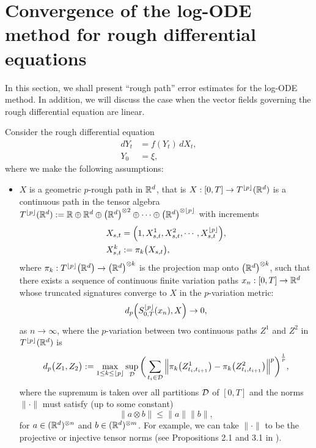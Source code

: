 \section{Convergence of the log-ODE method for rough differential equations}\label{apx:logodeconv}

In this section, we shall present ``rough path'' error estimates for the log-ODE method. In addition, we will discuss the case when the vector fields governing the rough differential equation are linear.
\medbreak

\begin{theorem}\label{thm:logODEthm}
Consider the rough differential equation
\begin{align}
dY_t & = f(Y_t)\,dX_t,\label{eq:RDE}\\
Y_0 & = \xi,\nonumber
\end{align}
where we make the following assumptions:
\begin{itemize}
\item $X$ is a geometric $p$-rough path in $\mathbb{R}^d$, that is $X : [0,T] \rightarrow T^{\lfloor p \rfloor}(\mathbb{R}^d)$ is a continuous path in the tensor algebra
$T^{\lfloor p \rfloor}(\mathbb{R}^d) := \mathbb{R} \oplus \mathbb{R}^d \oplus \big(\mathbb{R}^d\big)^{\otimes 2} \oplus \cdots \oplus \big(\mathbb{R}^d\big)^{\otimes \lfloor p \rfloor}$ with increments
\begin{align}
X_{s,t} & = \Big(1, X_{s,t}^1, X_{s,t}^2, \cdots, X_{s,t}^{\lfloor p \rfloor}\Big),\label{eq:roughpathincrements}\\
X_{s,t}^k & := \pi_k\big(X_{s,t}\big),\nonumber
\end{align}
where $\pi_k : T^{\lfloor p \rfloor}\big(\mathbb{R}^d\big)\rightarrow \big(\mathbb{R}^d\big)^{\otimes k}$ is the projection map onto $\big(\mathbb{R}^d\big)^{\otimes k}$, such that there exists a sequence of
continuous finite variation paths $x_n : [0,T] \rightarrow \mathbb{R}^d$ whose truncated signatures converge to $X$ in the $p$-variation metric:
\begin{equation}
d_p\Big(S_{0,T}^{\lfloor p \rfloor}(x_n), X\Big) \rightarrow 0,
\label{eq:rpconvege}
\end{equation}
as $n\rightarrow\infty$, where the $p$-variation between two continuous paths $Z^1$ and $Z^2$ in $T^{\lfloor p \rfloor}(\mathbb{R}^d)$ is
\begin{equation}
d_p\big(Z_1, Z_2\big) := \max_{1\leq k\leq \lfloor p \rfloor}\sup_{\mathcal{D}}\bigg(\sum_{t_i\in\mathcal{D}}\Big\|\pi_k\big(Z_{t_i, t_{i+1}}^1\big) - \pi_k\big(Z_{t_i, t_{i+1}}^2\big)\Big\|^p\bigg)^\frac{1}{p},
\label{eq:rpmetric}
\end{equation}
where the supremum is taken over all partitions $\mathcal{D}$ of $[0,T]$ and the norms $\|\cdot\|$ must satisfy (up to some constant)
\begin{equation}
\|a\otimes b\| \leq \|a\|\|b\|,\nonumber
\end{equation}
for $a\in(\mathbb{R}^d)^{\otimes n}$ and $b\in(\mathbb{R}^d)^{\otimes m}$. For example, we can take $\|\cdot\|$ to be the projective or injective tensor norms (see Propositions 2.1 and 3.1 in \cite{tensorproducts2002book}).


\end{itemize}
\end{theorem}
